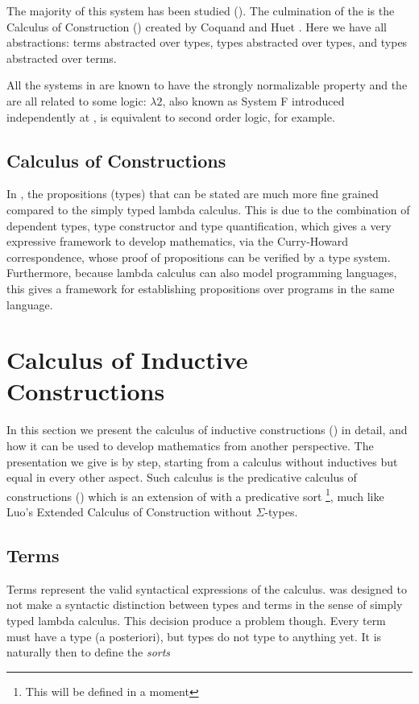 \newcommand{\SystemF}{\textsf{System F}}

The majority of this system has been studied (). 
The culmination of the \lambdaCube{}
is the Calculus of Construction (\CC{}) created by Coquand and Huet \cite{coqhuand:CoCIntro}. Here we have 
all abstractions: terms abstracted over types, types abstracted over types, and types abstracted over terms.

All the systems in \lambdaCube{} are known to have the strongly normalizable property and the are all
related to some logic: $\lambda 2$, also known as \SystemF{} introduced independently at 
\cite{girard:Paradox,Reynolds:systemFIntro}, is equivalent to second order logic, for example.

\subsection{Calculus of Constructions}
In \CC{}, the propositions (types) that can be stated are much more fine grained compared to the simply 
typed lambda calculus. This is due to the combination of dependent types, type constructor and type quantification,
which gives a very expressive framework to develop mathematics, via the Curry-Howard correspondence,
whose proof of propositions can be verified by a type system. Furthermore, because lambda 
calculus can also model programming languages, this gives a framework for establishing propositions over 
programs in the same language. 

\section{Calculus of Inductive Constructions}
\label{sec:CIC}
In this section we present the calculus of inductive constructions (\CIC{})
\cite{werner1994:IntroCIC,coqRef} in detail,
and how it can be used to develop mathematics from another perspective. The presentation we
give is by step, starting from a calculus without inductives but equal in every other aspect. Such calculus
is the predicative calculus of constructions (\CCw{}) which is an extension of \CC{} with a predicative 
sort \footnote{This will be defined in a moment}, much like
Luo's Extended Calculus of Construction \cite{Luo1994:ECC}
without $\Sigma$-types. 

\subsection{Terms} 
Terms represent the valid syntactical expressions of the calculus. \CIC{} was designed to not make a 
syntactic distinction between types and terms in the sense of simply typed lambda calculus. This decision
produce a problem though. Every term must have a type (a posteriori), but types do not type to anything yet.
It is naturally then to define the \emph{sorts}

